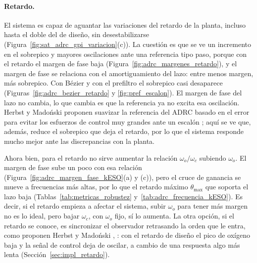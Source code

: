 \paragraph{Retardo.} El sistema es capaz de aguantar las variaciones del retardo de la planta,
incluso hasta el doble del de diseño, sin desestabilizarse (Figura~\ref{fig:sat_adrc_gpi_variacion}(c)).
La cuestión es que se ve un incremento en el sobrepico y mayores oscilaciones ante una referencia tipo
paso, porque con el retardo el margen de fase baja (Figura~\ref{fig:adrc_margenes_retardo}), y el
margen de fase se relaciona con el amortiguamiento del lazo: entre menos margen, más sobrepico. Con
Bézier y con el prefiltro el sobrepico casi desaparece (Figuras~\ref{fig:adrc_bezier_retardo} y
\ref{fig:pref_escalon}). El margen de fase del lazo no cambia, lo que cambia es que la referencia ya no
excita esa oscilación. Herbst y Madoński proponen suavizar la referencia del ADRC basado en el error
para evitar los esfuerzos de control muy grandes ante un escalón \cite[fig.~6.13 y
sec.~6.4.2]{herbst2024adrc}; aquí se ve que, además, reduce el sobrepico que deja el retardo, por lo
que el sistema responde mucho mejor ante las discrepancias con la planta.

Ahora bien, para el retardo no sirve aumentar la relación $\omega_o/\omega_c$ subiendo $\omega_o$. El
margen de fase sube un poco con esa relación (Figura~\ref{fig:adrc_margen_fase_kESO}(a) y (c)), pero
el cruce de ganancia se mueve a frecuencias más altas, por lo que el retardo máximo $\theta_{\max}$ que soporta el lazo
baja (Tablas~\ref{tab:metricas_robustez} y~\ref{tab:adrc_frecuencia_kESO}). Es decir, si el retardo empieza a
afectar el sistema, subir $\omega_o$ para tener más margen no es lo ideal, pero bajar $\omega_c$, con
$\omega_o$ fijo, sí lo aumenta. La otra opción, si el retardo se conoce, es sincronizar el observador
retrasando la orden que le entra, como proponen Herbst y Madoński \cite[sec.~9.4]{herbst2024adrc},
\cite{herbst2013practical}: con el retardo de diseño el pico de oxígeno baja y la señal de control deja
de oscilar, a cambio de una respuesta algo más lenta (Sección~\ref{sec:impl_retardo}).

